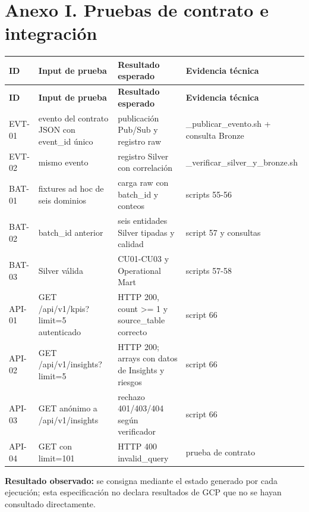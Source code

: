 \documentclass[11pt]{article}
\begin{document}
\clearpage
\section*{Anexo I. Pruebas de contrato e integración}

\begingroup\small
\begin{longtable}{@{}>{\raggedright\arraybackslash}p{}>{\raggedright\arraybackslash}p{}>{\raggedright\arraybackslash}p{}>{\raggedright\arraybackslash}p{}@{}}
\toprule
\textbf{ID} & \textbf{Input de prueba} & \textbf{Resultado esperado} & \textbf{Evidencia técnica} \\
\midrule
\endfirsthead
\toprule
\textbf{ID} & \textbf{Input de prueba} & \textbf{Resultado esperado} & \textbf{Evidencia técnica} \\
\midrule
\endhead
EVT-01 & evento del contrato JSON con event\_\allowbreak{}id único & publicación Pub/\allowbreak{}Sub y registro raw & 08\_\allowbreak{}publicar\_\allowbreak{}evento.sh + consulta Bronze \\
EVT-02 & mismo evento & registro Silver con correlación & 09\_\allowbreak{}verificar\_\allowbreak{}silver\_\allowbreak{}y\_\allowbreak{}bronze.sh \\
BAT-01 & fixtures ad hoc de seis dominios & carga raw con batch\_\allowbreak{}id y conteos & scripts 55-56 \\
BAT-02 & batch\_\allowbreak{}id anterior & seis entidades Silver tipadas y calidad & script 57 y consultas \\
BAT-03 & Silver válida & CU01-CU03 y Operational Mart & scripts 57-58 \\
API-01 & GET /api/\allowbreak{}v1/\allowbreak{}kpis?limit=5 autenticado & HTTP 200, count >= 1 y source\_\allowbreak{}table correcto & script 66 \\
API-02 & GET /api/\allowbreak{}v1/\allowbreak{}insights?limit=5 & HTTP 200; arrays con datos de Insights y riesgos & script 66 \\
API-03 & GET anónimo a /api/\allowbreak{}v1/\allowbreak{}insights & rechazo 401/\allowbreak{}403/\allowbreak{}404 según verificador & script 66 \\
API-04 & GET con limit=101 & HTTP 400 invalid\_\allowbreak{}query & prueba de contrato \\
\bottomrule
\end{longtable}
\endgroup

\textbf{Resultado observado:} se consigna mediante el estado generado por cada ejecución; esta especificación no declara resultados de GCP que no se hayan consultado directamente.\par
\end{document}
